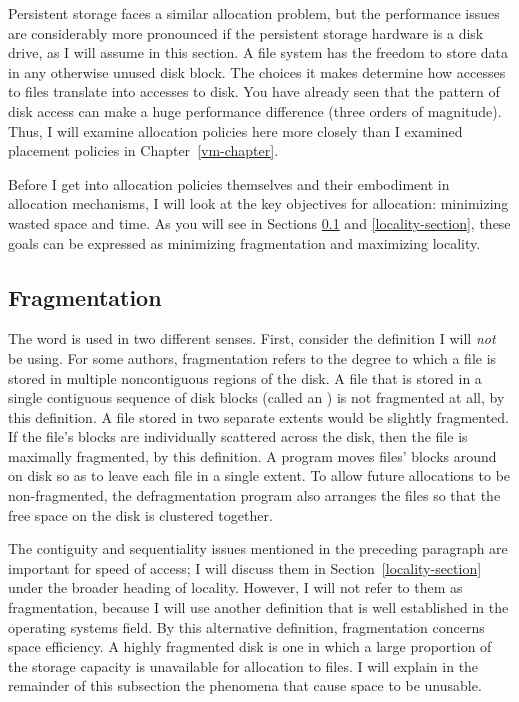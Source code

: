 Persistent storage faces a similar allocation problem, but the
performance issues are considerably more pronounced if the persistent
storage hardware is a disk drive, as I will assume in this section.  A file system
has the freedom to store data in any
otherwise unused disk block.  The choices it makes determine how
accesses to files translate into accesses to disk.  You have already seen
that the pattern of disk access can make a huge performance difference
(three orders of magnitude).  Thus, I will examine allocation
policies here more closely than I examined placement policies in
Chapter~\ref{vm-chapter}.

Before I get into allocation policies themselves and their
embodiment in allocation mechanisms, I will
look at the key objectives for allocation: minimizing wasted space
and time.  As you will see in Sections \ref{fragmentation-section} and
\ref{locality-section}, these goals can be
expressed as minimizing fragmentation and maximizing locality.

\subsection{Fragmentation}\label{fragmentation-section}

The word  is used in two different senses.
First, consider the definition I will \emph{not} be using.  For
some authors, fragmentation refers to the degree to which a file is
stored in multiple noncontiguous regions of the disk.  A file that is
stored in a single contiguous sequence of disk blocks (called an
) is not fragmented at all, by this definition.
A file stored in two separate extents would be
slightly fragmented.  If the file's blocks are individually scattered
across the disk, then the file is maximally fragmented, by this
definition.  A
 program moves files' blocks around on disk so
as to leave each file in a single extent.  To allow future allocations
to be non-fragmented, the defragmentation program also arranges the
files so that the free space on the disk is clustered together.

The contiguity and sequentiality issues mentioned in the preceding
paragraph are important for speed of access; I will discuss them in
Section~\ref{locality-section} under the broader heading of locality.  However,
I will not refer to them as fragmentation, because I will use
another definition that is well established in the
operating systems field.  By this alternative definition,
fragmentation concerns space efficiency.  A highly fragmented disk is
one in which a large proportion of the storage capacity is unavailable
for allocation to files.  I will explain in the remainder of this
subsection the phenomena that cause space to be unusable.

